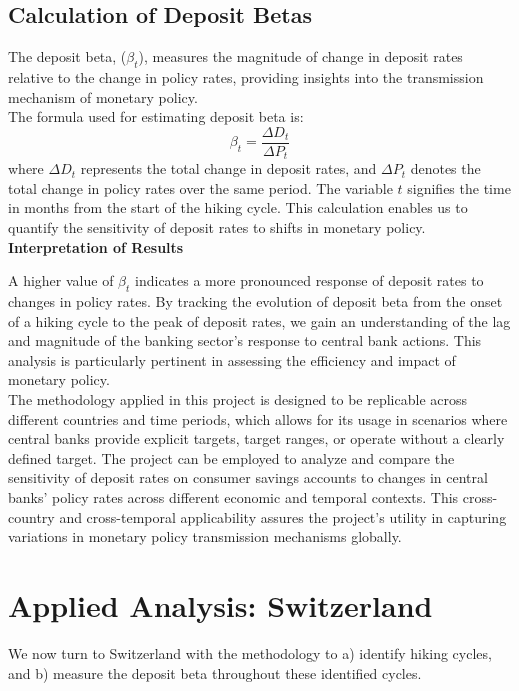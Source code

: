 \documentclass{article}
\begin{document}
\subsection{Calculation of Deposit Betas}

The deposit beta, (\( \beta_t \)), measures the magnitude of change in deposit rates relative to the change in policy rates, providing insights into the transmission mechanism of monetary policy.\\

The formula used for estimating deposit beta is:
\[
\beta_t = \frac{\Delta D_t}{\Delta P_t}
\]
where \( \Delta D_t \) represents the total change in deposit rates, and \( \Delta P_t \) denotes the total change in policy rates over the same period. The variable \( t \) signifies the time in months from the start of the hiking cycle. This calculation enables us to quantify the sensitivity of deposit rates to shifts in monetary policy.\\

\textbf{Interpretation of Results}

A higher value of \( \beta_t \) indicates a more pronounced response of deposit rates to changes in policy rates. By tracking the evolution of deposit beta from the onset of a hiking cycle to the peak of deposit rates, we gain an understanding of the lag and magnitude of the banking sector's response to central bank actions. This analysis is particularly pertinent in assessing the efficiency and impact of monetary policy.\\

The methodology applied in this project is designed to be replicable across different countries and time periods, which allows for its usage in scenarios where central banks provide explicit targets, target ranges, or operate without a clearly defined target. The project can be employed to analyze and compare the sensitivity of deposit rates on consumer savings accounts to changes in central banks’ policy rates across different economic and temporal contexts. This cross-country and cross-temporal applicability assures the project's utility in capturing variations in monetary policy transmission mechanisms globally.\\

\section{Applied Analysis: Switzerland}

We now turn to Switzerland with the methodology to a) identify hiking cycles, and b) measure the deposit beta throughout these identified cycles.\\
\end{document}
